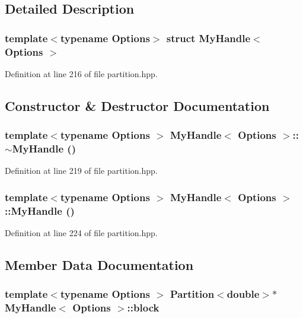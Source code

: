\subsection{Detailed Description}
\subsubsection*{template$<$typename Options$>$ struct MyHandle$<$ Options $>$}



Definition at line 216 of file partition.hpp.

\subsection{Constructor \& Destructor Documentation}
\hypertarget{struct_my_handle_aef75f473c1362cfc6d0417362ae80ac0}{
\subsubsection[{$\sim$MyHandle}]{\setlength{\rightskip}{0pt plus 5cm}template$<$typename Options $>$ {\bf MyHandle}$<$ {\bf Options} $>$::$\sim${\bf MyHandle} ()}}
\label{struct_my_handle_aef75f473c1362cfc6d0417362ae80ac0}


Definition at line 219 of file partition.hpp.\hypertarget{struct_my_handle_aa7c00cfefdecc0c58c8b1d9f31880030}{
\subsubsection[{MyHandle}]{\setlength{\rightskip}{0pt plus 5cm}template$<$typename Options $>$ {\bf MyHandle}$<$ {\bf Options} $>$::{\bf MyHandle} ()}}
\label{struct_my_handle_aa7c00cfefdecc0c58c8b1d9f31880030}


Definition at line 224 of file partition.hpp.

\subsection{Member Data Documentation}
\hypertarget{struct_my_handle_a26741ff1b1291395bdc4098ca83d568e}{
\subsubsection[{block}]{\setlength{\rightskip}{0pt plus 5cm}template$<$typename Options $>$ {\bf Partition}$<$double$>$$\ast$ {\bf MyHandle}$<$ {\bf Options} $>$::{\bf block}}}
\label{struct_my_handle_a26741ff1b1291395bdc4098ca83d568e}


